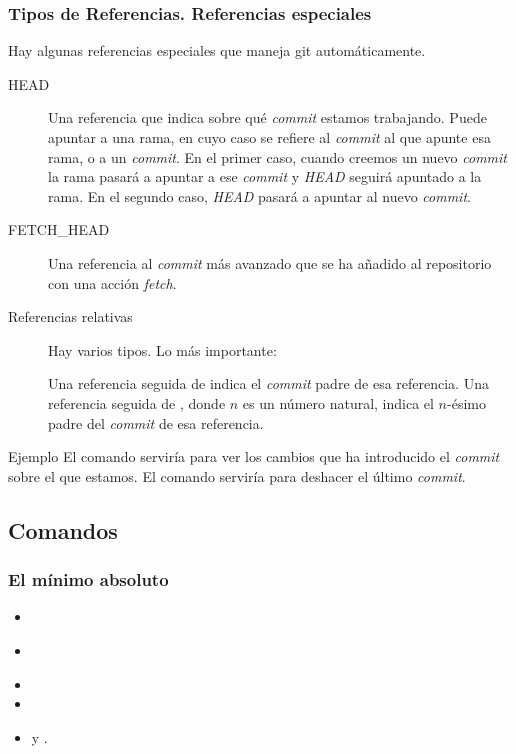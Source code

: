 \begin{frame}\frametitle{Tipos de Referencias. Referencias especiales}
\small
Hay algunas referencias especiales que maneja git automáticamente.

\begin{description}
    \item[HEAD] Una referencia que indica sobre qué \textit{commit} estamos trabajando.
    Puede apuntar a una rama,
    en cuyo caso se refiere al \textit{commit} al que apunte esa rama,
    o a un \textit{commit}.
    En el primer caso,
    cuando creemos un nuevo \textit{commit} la rama pasará a apuntar a ese \textit{commit}
    y \textit{HEAD} seguirá apuntado a la rama.
    En el segundo caso,
    \textit{HEAD} pasará a apuntar al nuevo \textit{commit}.

    \item[FETCH\_HEAD] Una referencia al \textit{commit} más avanzado que se ha añadido
    al repositorio con una acción \textit{fetch}.

    \item[Referencias relativas] Hay varios tipos. Lo más importante:

    Una referencia seguida de  indica
    el \textit{commit} padre de esa referencia.
    Una referencia seguida de , donde $n$ es un número natural, indica
    el $n$-ésimo padre del \textit{commit} de esa referencia.
\end{description}

\begin{block}{Ejemplo}
    El comando  serviría para ver los cambios
    que ha introducido el \textit{commit} sobre el que estamos.
    El comando  serviría para deshacer el último \textit{commit}.
\end{block}
\end{frame}

\subsection{Comandos}

\begin{frame}\frametitle{El mínimo absoluto}
\begin{itemize}
    \item {}
    \item \colorbox{red}{}
    \item {}
    \item {}
    \item {} y .
\end{itemize}
\end{frame}

